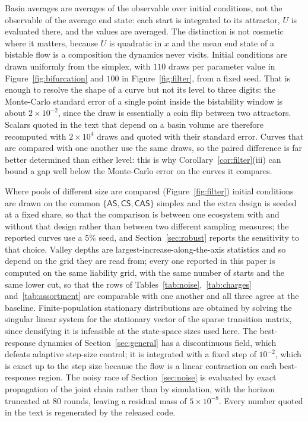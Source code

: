 \documentclass[pdflatex]{sn-jnl}
\theoremstyle{thmstyleone}
\theoremstyle{thmstylethree}
\theoremstyle{thmstyletwo}
\newcommand{\AS}{\textsf{AS}}
\newcommand{\CS}{\textsf{CS}}
\newcommand{\CAS}{\textsf{CAS}}
\begin{document}
Basin averages are averages of the observable over initial conditions, not the
observable of the average end state: each start is integrated to its
attractor, $U$ is evaluated there, and the values are averaged. The
distinction is not cosmetic where it matters, because $U$ is quadratic in $x$
and the mean end state of a bistable flow is a composition the dynamics never
visits. Initial conditions are drawn uniformly from the simplex, with $110$
draws per parameter value in Figure~\ref{fig:bifurcation} and $100$ in
Figure~\ref{fig:filter}, from a fixed seed. That is enough to resolve the
shape of a curve but not its level to three digits: the Monte-Carlo standard
error of a single point inside the bistability window is about $2\times
10^{-2}$, since the draw is essentially a coin flip between two attractors.
Scalars quoted in the text that depend on a basin volume are therefore
recomputed with $2\times10^{4}$ draws and quoted with their standard error.
Curves that are compared with one another use the same draws, so the paired
difference is far better determined than either level: this is why
Corollary~\ref{cor:filter}(iii) can bound a gap well below the
Monte-Carlo error on the curves it compares.

Where pools of different size are compared
(Figure~\ref{fig:filter}) initial conditions are drawn on the common
$\{\AS,\CS,\CAS\}$ simplex and the extra design is seeded at a fixed share, so
that the comparison is between one ecosystem with and without that design
rather than between two different sampling measures; the reported curves use a
$5\%$ seed, and Section~\ref{sec:robust} reports the sensitivity to that
choice. Valley depths are largest-increase-along-the-axis statistics and so
depend on the grid they are read from; every one reported in this paper is
computed on the same liability grid, with the same number of starts and the
same lower cut, so that the rows of
Tables~\ref{tab:noise},~\ref{tab:charges} and~\ref{tab:assortment} are
comparable with one another and all three agree at the baseline.
Finite-population stationary distributions are obtained by solving the
singular linear system for the stationary vector of the sparse transition
matrix, since densifying it is infeasible at the state-space sizes used here.
The best-response dynamics of Section~\ref{sec:general} has a discontinuous
field, which defeats adaptive step-size control; it is integrated with a fixed
step of $10^{-2}$, which is exact up to the step size because the flow is a
linear contraction on each best-response region. The noisy race of
Section~\ref{sec:noise} is evaluated by exact propagation of the joint chain
rather than by simulation, with the horizon truncated at $80$ rounds, leaving
a residual mass of $5\times10^{-8}$. Every number quoted in the text is
regenerated by the released code.
\end{document}
